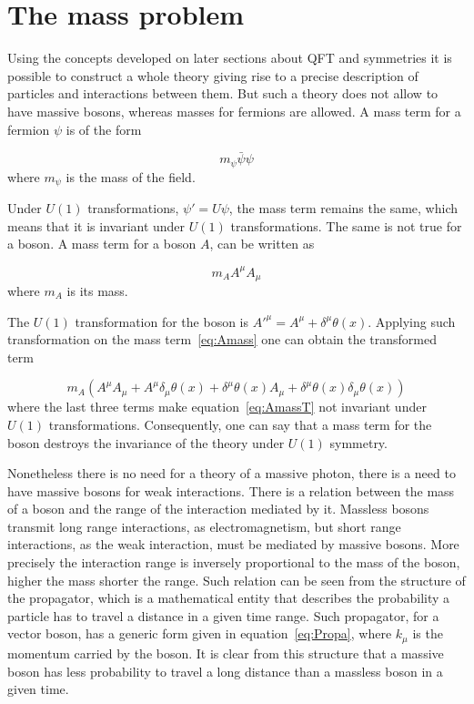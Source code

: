 \section{The mass problem}
\label{sec:mass}

Using the concepts developed on later sections about QFT and symmetries it is possible to construct a whole theory giving rise to a precise description of particles and interactions between them. But such a theory does not allow to have massive bosons, whereas masses for fermions are allowed. A mass term for a fermion $\psi$ is of the form 

\begin{equation*}
  m_{\psi}\bar{\psi}\psi
\end{equation*} where $m_{\psi}$ is the mass of the field.

Under $U(1)$ transformations, $\psi'=U \psi$, the mass term remains the same, which means that it is invariant under $U(1)$ transformations. The same is not true for a boson. A mass term for a boson $A$, can be written as 

\begin{equation}
  \label{eq:Amass}
  m_{A}A^{\mu}A_{\mu}
\end{equation} where $m_{A}$ is its mass.

The $U(1)$ transformation for the boson is $A'^{\mu}=A^{\mu}+\delta^{\mu}\theta(x)$. Applying such transformation on the mass term~\ref{eq:Amass} one can obtain the transformed term

\begin{equation}
  \label{eq:AmassT}
  m_{A}\left(A^{\mu}A_{\mu}+A^{\mu}\delta_{\mu}\theta(x)+\delta^{\mu}\theta(x)A_{\mu}+\delta^{\mu}\theta(x)\delta_{\mu}\theta(x)\right)
\end{equation}where the last three terms make equation~\ref{eq:AmassT} not invariant under $U(1)$ transformations. Consequently, one can say that a mass term for the boson destroys the invariance of the theory under $U(1)$ symmetry.

Nonetheless there is no need for a theory of a massive photon, there is a need to have massive bosons for weak interactions. There is a relation between the mass of a boson and the range of the interaction mediated by it. Massless bosons transmit long range interactions, as electromagnetism, but short range interactions, as the weak interaction, must be mediated by massive bosons. More precisely the interaction range is inversely proportional to the mass of the boson, higher the mass shorter the range. Such relation can be seen from the structure of the propagator, which is a mathematical entity that describes the probability a particle has to travel a distance in a given time range. Such propagator, for a vector boson, has a generic form given in equation~\ref{eq:Propa}, where $k_{\mu}$ is the momentum carried by the boson. It is clear from this structure that a massive boson has less probability to travel a long distance than a massless boson in a given time.

